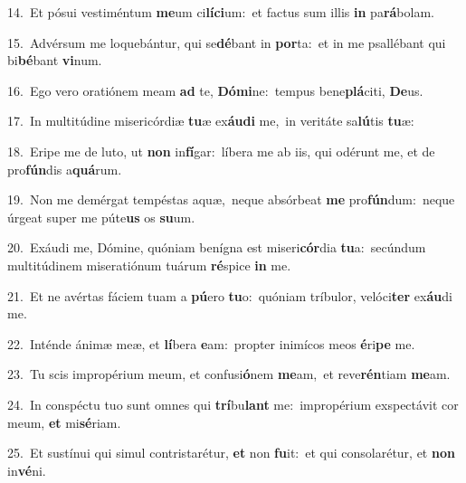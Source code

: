 {\numbfont\textcolor{\numbcolor}{14.}}~Et pósui vestiméntum \textbf{me}\-um ci\-\textbf{lí}\-\textbf{ci}um:~\star et factus sum illis \textbf{in} pa\-\textbf{rá}\-bolam.\par
{\numbfont\textcolor{\numbcolor}{15.}}~Advérsum me loquebántur, qui se\-\textbf{dé}\-bant in \textbf{por}\-ta:~\star et in me psallébant qui bi\-\textbf{bé}\-bant \textbf{vi}\-num.\par
{\numbfont\textcolor{\numbcolor}{16.}}~Ego vero oratiónem meam \textbf{ad} te, \textbf{Dó}\-\textbf{mi}ne:~\star tempus bene\-\textbf{plá}\-citi, \textbf{De}\-us.\par
{\numbfont\textcolor{\numbcolor}{17.}}~In multitúdine misericórdiæ \textbf{tu}\-æ ex\-\textbf{áu}\-\textbf{di} me,~\star in veritáte sa\-\textbf{lú}\-tis \textbf{tu}\-æ:\par
{\numbfont\textcolor{\numbcolor}{18.}}~Eripe me de luto, ut \textbf{non} in\-\textbf{fí}\-gar:~\star líbera me ab iis, qui odérunt me, et de pro\-\textbf{fún}\-dis a\-\textbf{quá}\-rum.\par
{\numbfont\textcolor{\numbcolor}{19.}}~Non me demérgat tempéstas aquæ,~\dagger neque absórbeat \textbf{me} pro\-\textbf{fún}\-dum:~\star neque úrgeat super me púte\textbf{us} os \textbf{su}\-um.\par
{\numbfont\textcolor{\numbcolor}{20.}}~Exáudi me, Dómine, quóniam benígna est miseri\-\textbf{cór}\-dia \textbf{tu}\-a:~\star secúndum multitúdinem miseratiónum tuárum \textbf{ré}\-spice \textbf{in} me.\par
{\numbfont\textcolor{\numbcolor}{21.}}~Et ne avértas fáciem tuam a \textbf{pú}\-ero \textbf{tu}\-o:~\star quóniam tríbulor, velóci\textbf{ter} ex\-\textbf{áu}\-di me.\par
{\numbfont\textcolor{\numbcolor}{22.}}~Inténde ánimæ meæ, et \textbf{lí}\-bera \textbf{e}\-am:~\star propter inimícos meos \textbf{é}\-ri\textbf{pe} me.\par
{\numbfont\textcolor{\numbcolor}{23.}}~Tu scis impropérium meum, et confusi\-\textbf{ó}\-nem \textbf{me}\-am,~\star et reve\-\textbf{rén}\-tiam \textbf{me}\-am.\par
{\numbfont\textcolor{\numbcolor}{24.}}~In conspéctu tuo sunt omnes qui \textbf{trí}\-bu\textbf{lant} me:~\star impropérium exspectávit cor meum, \textbf{et} mi\-\textbf{sé}\-riam.\par
{\numbfont\textcolor{\numbcolor}{25.}}~Et sustínui qui simul contristarétur, \textbf{et} non \textbf{fu}\-it:~\star et qui consolarétur, et \textbf{non} in\-\textbf{vé}\-ni.\par
